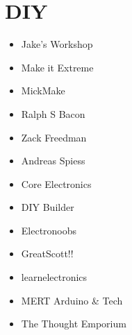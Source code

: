 \documentclass[letterpaper,10pt,english,openany,oneside]{sphinxmanual}
\begin{document}
\section{DIY}
\label{\detokenize{youtube:diy}}\begin{itemize}
\item {} 
\sphinxAtStartPar
Jake’s Workshop

\item {} 
\sphinxAtStartPar
Make it Extreme

\item {} 
\sphinxAtStartPar
MickMake

\item {} 
\sphinxAtStartPar
Ralph S Bacon

\item {} 
\sphinxAtStartPar
Zack Freedman

\item {} 
\sphinxAtStartPar
Andreas Spiess

\item {} 
\sphinxAtStartPar
Core Electronics

\item {} 
\sphinxAtStartPar
DIY Builder

\item {} 
\sphinxAtStartPar
Electronoobs

\item {} 
\sphinxAtStartPar
GreatScott!!

\item {} 
\sphinxAtStartPar
learnelectronics

\item {} 
\sphinxAtStartPar
MERT Arduino \& Tech

\item {} 
\sphinxAtStartPar
The Thought Emporium

\end{itemize}
\end{document}
